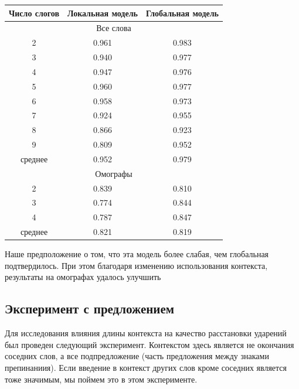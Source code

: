 \documentclass[14pt, a4paper, russian]{report}
\begin{document}
\begin{normalsize}
\begin{table}[H]
	\begin{small}
		\begin{center}
			\begin{tabular}{|c|c|c|}
				\hline
				Число слогов & Локальная модель &  Глобальная модель\\
				\hline
				\multicolumn{3}{|c|}{Все слова} \\			
				\hline
				2 &  0.961 & 0.983 \\
				\hline
				3 & 0.940& 0.977 \\
				\hline
				4 &0.947& 0.976 \\
				\hline
				5 &0.960 & 0.977\\
				\hline
				6 &0.958 &  0.973  \\
				\hline
				7 & 0.924 & 0.955\\
				\hline
				8 & 0.866 & 0.923\\
				\hline
				9 & 0.809 & 0.952\\
				\hline
				среднее & 0.952 & 0.979\\
				\hline				
				\multicolumn{3}{|c|}{Омографы} \\			
				\hline
				2 &0.839 & 0.810\\
				\hline
				3 &0.774 & 0.844  \\
				\hline
				4 & 0.787 &0.847\\
				\hline
				среднее & 0.821 &0.819\\
				\hline				
				
			\end{tabular}
		\end{center}
	\end{small}
	\label{table:local_char}
\end{table}	

Наше предположение о том, что эта модель более слабая, чем глобальная подтвердилось. При этом благодаря изменению использования контекста, результаты на омографах удалось улучшить

\subsection{Эксперимент с предложением}

Для исследования влияния длины контекста на качество расстановки ударений был проведен следующий эксперимент. Контекстом здесь является не окончания соседних слов, а все подпредложение (часть предложения между знаками препинаниия). Если введение в контекст других слов кроме соседних является тоже значимым, мы поймем это в этом эксперименте.


\end{normalsize}
\end{document}
